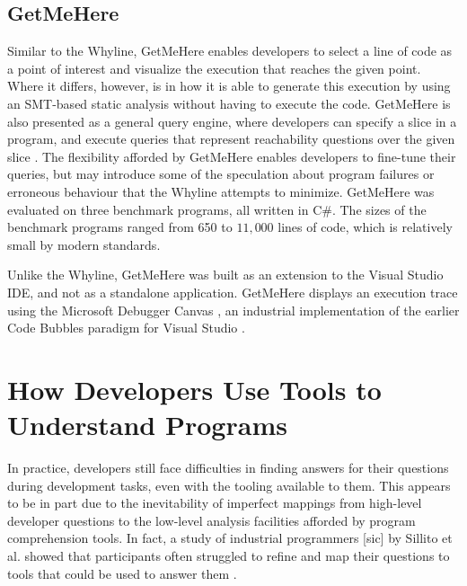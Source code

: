 \subsection{GetMeHere}
\label{subsec:GetMeHere}

\par Similar to the Whyline, GetMeHere enables developers to select a line of 
code as a point of interest and visualize the execution that reaches the given 
point.
Where it differs, however, is in how it is able to generate this execution
by using an SMT-based static analysis \cite{barnett-2014-get} without having to
execute the code.
GetMeHere is also presented as a general query engine, where developers can
specify a slice in a program, and execute queries that represent reachability
questions over the given slice \cite{barnett-2014-get}.
The flexibility afforded by GetMeHere enables developers to fine-tune their
queries, but may introduce some of the speculation about program failures or
erroneous behaviour that the Whyline attempts to minimize.
GetMeHere was evaluated on three benchmark programs, all written in C\#.
The sizes of the benchmark programs ranged from 650 to $11,000$ lines of code,
which is relatively small by modern standards.

\par Unlike the Whyline, GetMeHere was built as an extension to the Visual
Studio \ac{IDE}, and not as a standalone application.
GetMeHere displays an execution trace using the Microsoft Debugger Canvas 
\cite{bragdon-2012-canvas}, an industrial implementation of the earlier 
Code Bubbles \cite{bragdon-2010-code-bubbles} paradigm for Visual Studio
\cite{barnett-2014-get}.

\section{How Developers Use Tools to Understand Programs}
\label{sec:HowDevelopersUseToolsToUnderstandPrograms}

\noindent In practice, developers still face difficulties in finding answers 
for their questions during development tasks, even with the tooling available 
to them.
This appears to be in part due to the inevitability of imperfect mappings from
high-level developer questions to the low-level analysis facilities afforded
by program comprehension tools.
In fact, a study of industrial programmers [sic] by Sillito et al. showed that 
participants often struggled to refine and map their questions to tools
that could be used to answer them \cite{sillito-2006-questions-during-task}.


